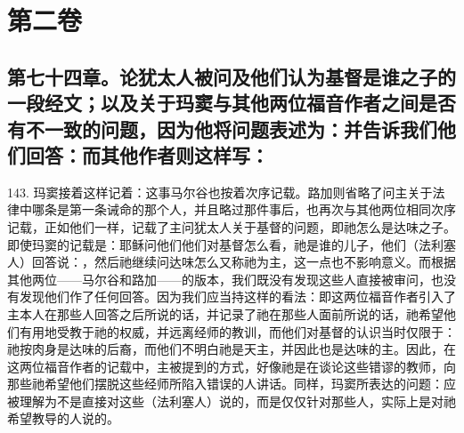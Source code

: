 

\section{第二卷}


\subsection{第七十四章。论犹太人被问及他们认为基督是谁之子的一段经文；以及关于玛窦与其他两位福音作者之间是否有不一致的问题，因为他将问题表述为：并告诉我们他们回答：而其他作者则这样写：}

143. 玛窦接着这样记着：这事马尔谷也按着次序记载。路加则省略了问主关于法律中哪条是第一条诫命的那个人，并且略过那件事后，也再次与其他两位相同次序记载，正如他们一样，记载了主问犹太人关于基督的问题，即祂怎么是达味之子。即使玛窦的记载是：耶稣问他们他们对基督怎么看，祂是谁的儿子，他们（法利塞人）回答说：，然后祂继续问达味怎么又称祂为主，这一点也不影响意义。而根据其他两位——马尔谷和路加——的版本，我们既没有发现这些人直接被审问，也没有发现他们作了任何回答。因为我们应当持这样的看法：即这两位福音作者引入了主本人在那些人回答之后所说的话，并记录了祂在那些人面前所说的话，祂希望他们有用地受教于祂的权威，并远离经师的教训，而他们对基督的认识当时仅限于：祂按肉身是达味的后裔，而他们不明白祂是天主，并因此也是达味的主。因此，在这两位福音作者的记载中，主被提到的方式，好像祂是在谈论这些错谬的教师，向那些祂希望他们摆脱这些经师所陷入错误的人讲话。同样，玛窦所表达的问题：应被理解为不是直接对这些（法利塞人）说的，而是仅仅针对那些人，实际上是对祂希望教导的人说的。\par

